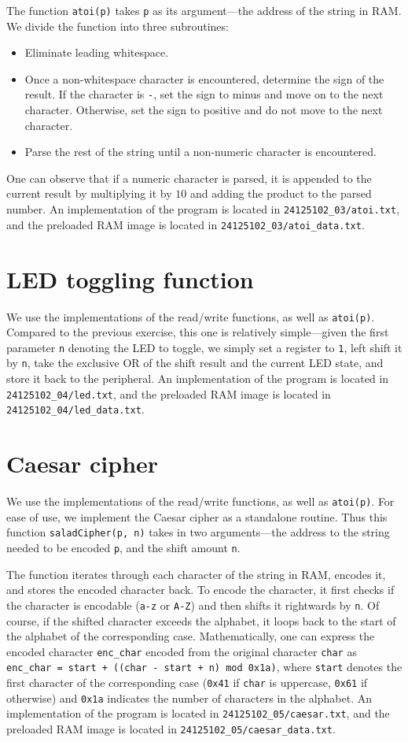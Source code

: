 \documentclass{exam}
\begin{document}
The function \verb|atoi(p)| takes \verb|p| as its argument---the address of the string in RAM. We divide the function into three subroutines:
\begin{itemize}
	\item Eliminate leading whitespace.
	\item Once a non-whitespace character is encountered, determine the sign of the result. If the character is \verb|-|, set the sign to minus and move on to the next character. Otherwise, set the sign to positive and do not move to the next character.
	\item Parse the rest of the string until a non-numeric character is encountered.
\end{itemize}
One can observe that if a numeric character is parsed, it is appended to the current result by multiplying it by $10$ and adding the product to the parsed number. An implementation of the program is located in \verb|24125102_03/atoi.txt|, and the preloaded RAM image is located in \verb|24125102_03/atoi_data.txt|.

\section{LED toggling function}
We use the implementations of the read/write functions, as well as \verb|atoi(p)|. Compared to the previous exercise, this one is relatively simple---given the first parameter \verb|n| denoting the LED to toggle, we simply set a register to \verb|1|, left shift it by \verb|n|, take the exclusive OR of the shift result and the current LED state, and store it back to the peripheral. An implementation of the program is located in \verb|24125102_04/led.txt|, and the preloaded RAM image is located in \verb|24125102_04/led_data.txt|.

\section{Caesar cipher}
We use the implementations of the read/write functions, as well as \verb|atoi(p)|. For ease of use, we implement the Caesar cipher as a standalone routine. Thus this function \verb|saladCipher(p, n)| takes in two arguments---the address to the string needed to be encoded \verb|p|, and the shift amount \verb|n|.

The function iterates through each character of the string in RAM, encodes it, and stores the encoded character back. To encode the character, it first checks if the character is encodable (\verb|a-z| or \verb|A-Z|) and then shifts it rightwards by \verb|n|. Of course, if the shifted character exceeds the alphabet, it loops back to the start of the alphabet of the corresponding case. Mathematically, one can express the encoded character \verb|enc_char| encoded from the original character \verb|char| as \verb|enc_char = start + ((char - start + n) mod 0x1a)|, where \verb|start| denotes the first character of the corresponding case (\verb|0x41| if \verb|char| is uppercase, \verb|0x61| if otherwise) and \verb|0x1a| indicates the number of characters in the alphabet. An implementation of the program is located in \verb|24125102_05/caesar.txt|, and the preloaded RAM image is located in \verb|24125102_05/caesar_data.txt|.
\end{document}
